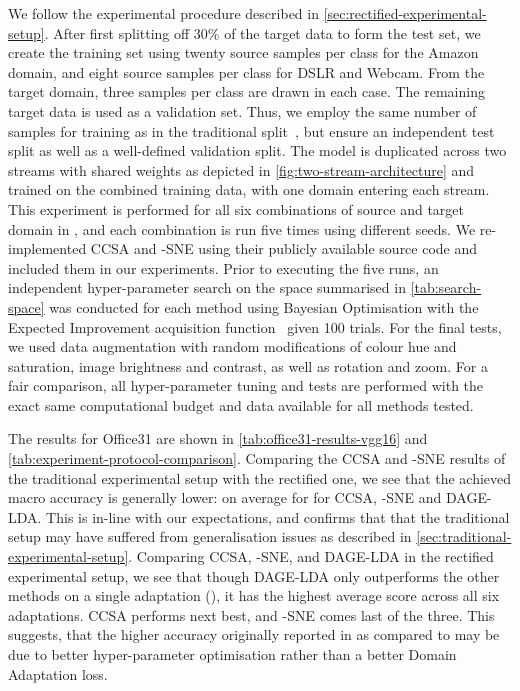 \documentclass[journal]{IEEEtran}
\begin{document}
We follow the experimental procedure described in \cref{sec:rectified-experimental-setup}. After first splitting off 30\% of the target data to form the test set, we create the training set using twenty source samples per class for the Amazon domain, and eight source samples per class for DSLR and Webcam. From the target domain, three samples per class are drawn in each case. The remaining target data is used as a validation set.
Thus, we employ the same number of samples for training as in the traditional split~\cite{tzeng2015simultaneous, xu2019dsne, motiian2017ccsa}, but ensure an independent test split as well as a well-defined validation split.
The model is duplicated across two streams with shared weights as depicted in \cref{fig:two-stream-architecture} and trained on the combined training data, with one domain entering each stream.
This experiment is performed for all six combinations of source and target domain in , and each combination is run five times using different seeds.
We re-implemented CCSA and -SNE using their publicly available source code and included them in our experiments. Prior to executing the five runs, an independent hyper-parameter search on the space summarised in \cref{tab:search-space} was conducted for each method using Bayesian Optimisation with the Expected Improvement acquisition function~\cite{brochu2010} given 100 trials. For the final tests, we used data augmentation with random modifications of colour hue and saturation, image brightness and contrast, as well as rotation and zoom. For a fair comparison, all hyper-parameter tuning and tests are performed with the exact same computational budget and data available for all methods tested.

The results for Office31 are shown in \cref{tab:office31-results-vgg16} and \cref{tab:experiment-protocol-comparison}. 
Comparing the CCSA and -SNE results of the traditional experimental setup with the rectified one, we see that the achieved macro accuracy is generally lower:  on average for for CCSA, -SNE and DAGE-LDA. This is in-line with our expectations, and confirms that that the traditional setup may have suffered from generalisation issues as described in \cref{sec:traditional-experimental-setup}. Comparing CCSA, -SNE, and DAGE-LDA in the rectified experimental setup, we see that though DAGE-LDA only outperforms the other methods on a single adaptation (), it has the highest average score across all six adaptations. CCSA performs next best, and -SNE comes last of the three. This suggests, that the higher accuracy originally reported in \cite{xu2019dsne} as compared to \cite{motiian2017ccsa} may be due to better hyper-parameter optimisation rather than a better Domain Adaptation loss.
\end{document}
